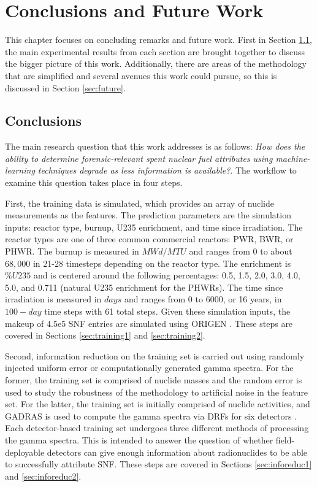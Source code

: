 \chapter{Conclusions and Future Work}
\label{ch:concl}

This chapter focuses on concluding remarks and future work.  First in Section
\ref{sec:concl}, the main experimental results from each section are brought
together to discuss the bigger picture of this work.  Additionally, there are
areas of the methodology that are simplified and several avenues this work
could pursue, so this is discussed in Section \ref{sec:future}.

\section{Conclusions}
\label{sec:concl}

The main research question that this work addresses is as follows: \textit{How
does the ability to determine forensic-relevant spent nuclear fuel attributes
using machine-learning techniques degrade as less information is available?}. 
The workflow to examine this question takes place in four steps.  

First, the training data is simulated, which provides an array of nuclide
measurements as the features. The prediction parameters are the simulation
inputs: reactor type, burnup, \gls{U235} enrichment, and time since
irradiation.  The reactor types are one of three common commercial reactors:
\gls{PWR}, \gls{BWR}, or \gls{PHWR}.  The burnup is measured in $MWd/MTU$ and
ranges from 0 to about $68,000$ in 21-28 timesteps depending on the reactor
type.  The enrichment is $\%U235$ and is centered around the following
percentages: 0.5, 1.5, 2.0, 3.0, 4.0, 5.0, and 0.711 (natural \gls{U235}
enrichment for the \gls{PHWR}s).  The time since irradiation is measured in
$days$ and ranges from 0 to 6000, or 16 years, in $100-day$ time steps with 61
total steps. Given these simulation inputs, the makeup of 4.5e5 \gls{SNF}
entries are simulated using \gls{ORIGEN} \cite{scale, origen, origenarp}.
These steps are covered in Sections \ref{sec:training1} and
\ref{sec:training2}.

Second, information reduction on the training set is carried out using randomly
injected uniform error or computationally generated gamma spectra. For the
former, the training set is comprised of nuclide masses and the random error is
used to study the robustness of the methodology to artificial noise in the
feature set.  For the latter, the training set is initially comprised of
nuclide activities, and \gls{GADRAS} is used to compute the gamma spectra via
\gls{DRF}s for six detectors \cite{gadras}. Each detector-based training set
undergoes three different methods of processing the gamma spectra. This is
intended to answer the question of whether field-deployable detectors can give
enough information about radionuclides to be able to successfully attribute
\gls{SNF}.  These steps are covered in Sections \ref{sec:inforeduc1} and
\ref{sec:inforeduc2}.

